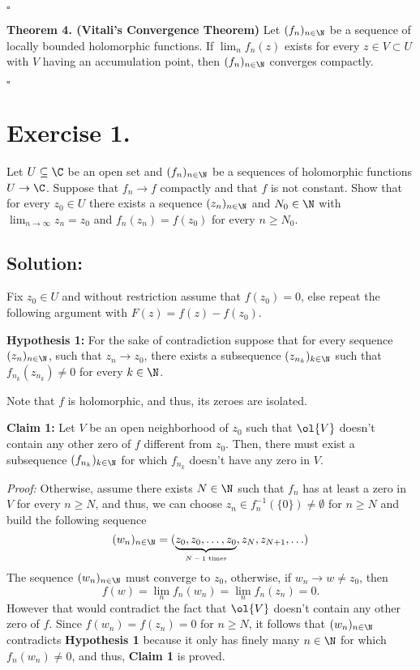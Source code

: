 $ $\hfill $\square$

\textbf{Theorem 4. (Vitali's Convergence Theorem)} Let $(f_n)_{n\in \N}$ be a sequence of locally bounded holomorphic functions. If $\lim_n f_n(z)$ exists for every $z \in V\subset U$ with $V$ having an accumulation point, then $(f_n)_{n\in \N}$ converges compactly.

$ $\hfill $\square$


\section*{Exercise 1.}

Let $U \subseteq \C$ be an open set and $(f_n)_{n\in\N}$ be a sequences of holomorphic functions $U \to \C$. Suppose that $f_n \to f$ compactly and that $f$ is not constant. Show that for every $z_0 \in U$ there exists a sequence $(z_n)_{n\in\N}$ and $N_0 \in \N$ with $\lim_{n\to\infty} z_n = z_0$ and $f_n(z_n) = f(z_0)$ for every $n \geq N_0$.

\subsection*{Solution:}

Fix $z_0 \in U$ and without restriction assume that $f(z_0) = 0$, else repeat the following argument with $F(z) = f(z) - f(z_0)$. 

\textbf{Hypothesis 1:} For the sake of contradiction suppose that for every sequence $(z_n)_{n\in\N}$, such that $z_n\to z_0$, there exists a subsequence $(z_{n_k})_{k\in\N}$ such that $f_{n_k}(z_{n_k}) \neq 0$ for every $k\in\N$. 


Note that $f$ is holomorphic, and thus, its zeroes are isolated.

\textbf{Claim 1:} Let $V$ be an open neighborhood of $z_0$ such that $\ol{V}$ doesn't contain any other zero of $f$ different from $z_0$. Then, there must exist a subsequence $(f_{n_k})_{k\in \N}$ for which $f_{n_k}$ doesn't have any zero in $V$. 

\textit{Proof:} Otherwise, assume there exists $N\in \N$ such that $f_n$ has at least a zero in $V$ for every $n \geq N$, and thus, we can choose $z_n \in f_n^{-1}(\{0\}) \neq \emptyset$ for $n \geq N$ and build the following sequence
\[ (w_n)_{n\in\N} = (\underbrace{z_0, z_0,\ldots, z_0}_{\mbox{\tiny{$N-1$ times}}}, z_N, z_{N+1},\ldots) \]
The sequence $(w_n)_{n\in\N}$ must converge to $z_0$, otherwise, if $w_n \to w \neq z_0$, then
\[ f(w) = \lim_n f_n(w_n) = \lim_n f_n(z_n) = 0. \]
However that would contradict the fact that $\ol{V}$ doesn't contain any other zero of $f$. Since $f(w_n) = f(z_n) = 0$ for $n \geq N$, it follows that $(w_n)_{n\in\N}$ contradicts \textbf{Hypothesis 1} because it only has finely many $n\in \N$ for which $f_n(w_n) \neq 0$, and thus, \textbf{Claim 1} is proved.

